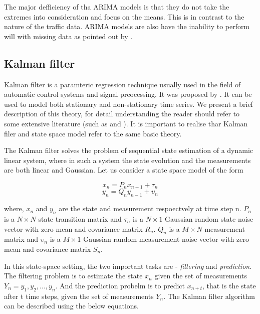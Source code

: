 The major defficiency of tha ARIMA models is that they do not take the extremes into
consideration and focus on the means. This is in contrast to the nature of the traffic data.
ARIMA models are also have the inability to perform will with missing data as pointed out by
\citet{smith1997traffic}.


\subsection{Kalman filter}
Kalman filter is a paramteric regression technique usually used in the field of automatic control
systems and signal preocessing. It was proposed by \citet{kalman1960new}. It can be used to model
both stationary and non-stationary time series. We present a brief description of this theory, for
detail understanding the reader should refer to some extensive literature (such as
\citet{harvey1990forecasting}  and \citet{haykin2001kalman}). It is important to realise thar Kalman
filer and state space model refer to the same basic theory.


The Kalman filter solves the problem of sequential state estimation of a dynamic linear system, where
in such a system the state evolution and the measurements are both linear and Gaussian. Let us consider
a state space model of the form

        \begin{equation} x_{n} = P_{n}x_{n-1} + \tau_{n} \end{equation}
        \begin{equation} y_{n} = Q_{n}y_{n-1} + \upsilon_{n} \end{equation}

where, $x_{n}$ and $y_{n}$ are the state and measurement respoectvely at time step n.
$P_{n}$ is a $N \times N$ state transition matrix and $\tau_{n}$ is a $N \times 1$ Gaussian
random state noise vector with zero mean and covariance matrix $R_{n}$. $Q_{n}$ is a $M \times N$
measurement matrix and $\upsilon_{n}$ is a $M \times 1$ Gaussian random measurement noise vector
with zero mean and covariance matrix $S_{n}$.

In this state-space setting, the two important tasks are - \textit{filtering} and \textit{prediction}.
The filtering problem is to estimate the state $x_{n}$ given the set of measurements
$Y_{n} = y_{1}, y_{2},...,y_{n}$. And the prediction probelm is to predict $x_{n+t}$, that is the
state after t time steps, given the set of measurements $Y_{n}$. The Kalman filter algorithm can be
described using the below equations.

